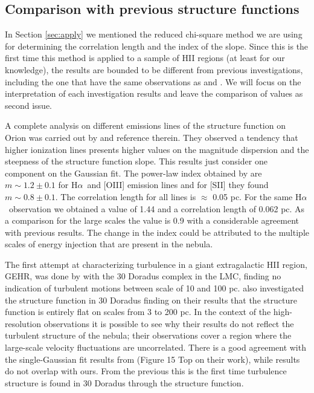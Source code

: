 \documentclass[fleqn,usenatbib, useAMS, a4paper]{mnras}
\newcommand\halpha{H${\alpha}$}
\begin{document}
\subsection{Comparison with previous structure functions}

In Section \ref{sec:apply} we mentioned the reduced chi-square method we are using for determining the correlation length and the index of the slope. Since this is the first time this method is applied to a sample of HII regions (at least for our knowledge), the results are bounded to be different from previous investigations, including the one that have the same observations as \citet{arthur2016turbulence} and \citet{2019arXiv191203543M}. We will focus on the interpretation of each investigation results and leave the comparison of values as second issue.

A complete analysis on different emissions lines of the structure function on Orion was carried out by \citet{arthur2016turbulence} and reference therein. 
They observed a tendency that higher ionization lines presents higher values on the magnitude dispersion and the steepness of the structure function slope. 
This results just consider one component on the Gaussian fit. 
The power-law index obtained by \citet{arthur2016turbulence} are \(m \sim 1.2 \pm 0.1\) for \halpha\ and [OIII] emission lines and for [SII] they found \(m \sim 0.8 \pm 0.1\). 
The correlation length for all lines is \(\approx\) 0.05 pc. For the same \halpha\ observation we obtained a value of 1.44 and a correlation length of 0.062 pc. 
As a comparison for the large scales \citep{1987A&A...176..347H} the value is 0.9 with a considerable agreement with previous results. 
The change in the index could be attributed to the multiple scales of energy injection that are present in the nebula.

The first attempt at characterizing turbulence in a giant extragalactic HII region, GEHR, was done by \citet{1961MNRAS.122....1F} with the 30 Doradus complex in the LMC, finding no indication of turbulent motions between scale of 10 and 100 pc.
\citet{2019arXiv191203543M} also investigated the structure function in 30 Doradus finding on their results that the structure function is entirely flat on scales from 3 to 200 pc.
In the context of the high-resolution observations it is possible to see why their results do not reflect the turbulent structure of the nebula; their observations cover a region where the large-scale velocity fluctuations are uncorrelated.
There is a good agreement with the single-Gaussian fit results from \citet{2019arXiv191203543M} (Figure 15 Top on their work), while \citet{1961MNRAS.122....1F} results do not overlap with ours.
From the previous this is the first time turbulence structure is found in 30 Doradus through the structure function.
\end{document}
